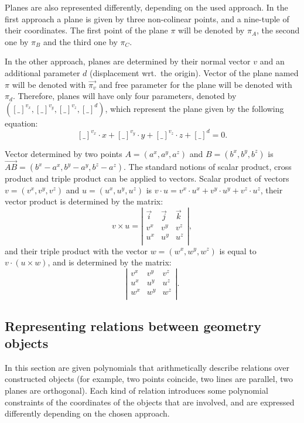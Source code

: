 \documentclass[final,1p,times,authoryear]{elsarticle}
\begin{document}
Planes are also represented differently, depending on the used
approach. In the first approach a plane is given by three non-colinear
points, and a nine-tuple of their coordinates. The first point of the
plane $\pi$ will be denoted by $\pi_A$, the second one by $\pi_B$ and
the third one by $\pi_C$.

In the other approach, planes are determined by their normal vector
$v$ and an additional parameter $d$ (displacement wrt.~the
origin). Vector of the plane named $\pi$ will be denoted with
$\overrightarrow{\pi_v}$ and free parameter for the plane will be
denoted with $\pi_d$. Therefore, planes will have only four
parameters, denoted by
$({[\_]}^{v_x}, {[\_]}^{v_y}, {[\_]}^{v_z}, {[\_]}^{d})$, which
represent the plane given by the following equation:
$${[\_]}^{v_x}\cdot x + {[\_]}^{v_y}\cdot y + {[\_]}^{v_z}\cdot z +
{[\_]}^{d} = 0.$$ 

Vector determined by two points $A = (a^x, a^y, a^z)$ and
$B = (b^x, b^y, b^z)$ is
$\overrightarrow{AB} = (b^x- a^x, b^y - a^y, b^z - a^z)$. The standard
notions of scalar product, cross product and triple product can be
applied to vectors. Scalar product of vectors $v = (v^x, v^y, v^z)$
and $u = (u^x, u^y, u^z)$ is
$v\cdot u = v^x\cdot u^x+ v^y\cdot u^y + v^z\cdot u^z$, their vector
product is determined by the matrix:
$$ v\times u = \left|\begin{array}{ccc} \overrightarrow{i} & \overrightarrow{j} & \overrightarrow{k} \\ 
                       v^x& v^y & v^z \\
                       u^x& u^y & u^z \\
\end{array}\right|,$$
and their triple product with the vector $w = (w^x, w^y, w^z)$ is
equal to $v\cdot (u \times w)$, and is determined by the matrix:
$$\left|\begin{array}{ccc} v^x& v^y & v^z \\ u^x& u^y
  & u^z \\ w^x& w^y & w^z \\
\end{array}\right|.$$


\subsection{Representing relations between geometry objects}
In this section are given polynomials that arithmetically describe
relations over constructed objects (for example, two points coincide,
two lines are parallel, two planes are orthogonal).  Each kind of
relation introduces some polynomial constraints of the coordinates of
the objects that are involved, and are expressed differently depending
on the chosen approach.
\end{document}
